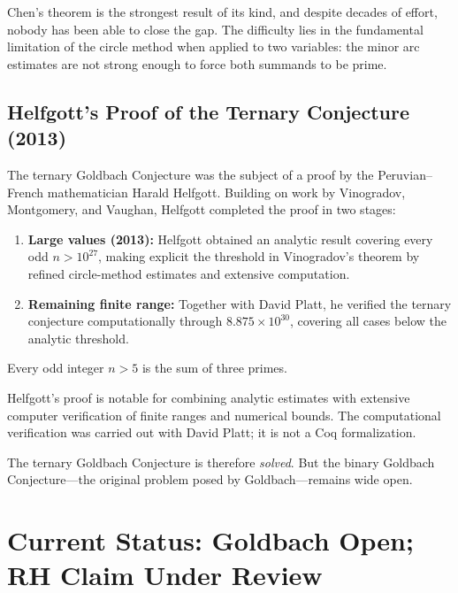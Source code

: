 Chen's theorem is the strongest result of its kind, and despite decades of effort, nobody has been able to close the gap. The difficulty lies in the fundamental limitation of the circle method when applied to two variables: the minor arc estimates are not strong enough to force both summands to be prime.

\subsection{Helfgott's Proof of the Ternary Conjecture (2013)}

The ternary Goldbach Conjecture was the subject of a proof by the Peruvian--French mathematician Harald Helfgott. Building on work by Vinogradov, Montgomery, and Vaughan, Helfgott completed the proof in two stages:

\begin{enumerate}
    \item \textbf{Large values (2013):} Helfgott obtained an analytic result covering every odd $n > 10^{27}$, making explicit the threshold in Vinogradov's theorem by refined circle-method estimates and extensive computation.
    \item \textbf{Remaining finite range:} Together with David Platt, he verified the ternary conjecture computationally through $8.875\times 10^{30}$, covering all cases below the analytic threshold.
\end{enumerate}

\begin{theorem}[Helfgott, 2013]\label{thm:helfgott}
Every odd integer $n > 5$ is the sum of three primes.
\end{theorem}

Helfgott's proof is notable for combining analytic estimates with extensive computer verification of finite ranges and numerical bounds. The computational verification was carried out with David Platt; it is not a Coq formalization.

The ternary Goldbach Conjecture is therefore \emph{solved}. But the binary Goldbach Conjecture---the original problem posed by Goldbach---remains wide open.

\section{Current Status: Goldbach Open; RH Claim Under Review}

